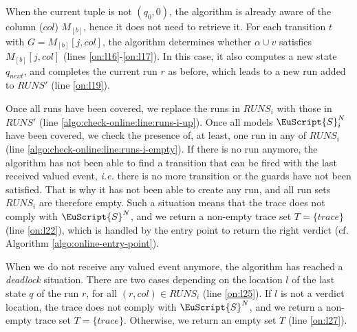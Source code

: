 When the current tuple is not $(q_0, 0)$, the algorithm is
already aware of the column ($col$) $M_{[b]}$, hence it does not
need to retrieve it. For each transition $t$ with $G = M_{[b]}[j,
col]$, the algorithm determines whether $\alpha \cup v$ satisfies
$M_{[b]}[j, col]$ (lines \ref{on:l16}-\ref{on:l17}).
In this case, it also computes a new state $q_{next}$, and
completes the current run $r$ as before, which leads to a new
run added to $RUNS'$ (line \ref{on:l19}).

Once all runs have been covered, we replace the runs in  $RUNS_i$
with those in $RUNS'$ (line
\ref{algo:check-online:line:runs-i-up}). Once all models
$\EuScript{S}_i^N$ have been covered, we check the presence
of, at least, one run in any of $RUNS_i$ (line
\ref{algo:check-online:line:runs-i-empty}). If there is no run
anymore, the algorithm has not been able to find a transition
that can be fired with the last received valued event,
\emph{i.e.} there is no more transition or the guards have not
been satisfied. That is why it has not been able to create any
run, and all run sets $RUNS_i$ are therefore empty. Such a
situation means that the trace does not comply with
$\EuScript{S}^N$, and we return a non-empty trace set $T = \{
trace \}$ (line \ref{on:l22}), which is handled by the entry point to
return the right verdict (cf. Algorithm
\ref{algo:online-entry-point}).

When we do not receive any valued event anymore, the algorithm
has reached a \emph{deadlock} situation. There are two cases
depending on the location $l$ of the last state $q$ of the run
$r$, for all $(r, col) \in RUNS_i$ (line \ref{on:l25}).
If $l$ is not a verdict location, the trace does not
comply with  $\EuScript{S}^N$, and we return a non-empty trace
set $T = \{ trace \}$.  Otherwise, we return an empty set $T$
(line \ref{on:l27}).

